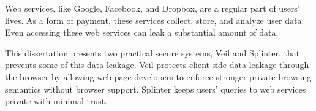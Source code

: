 Web services, like Google, Facebook, and Dropbox, 
are a regular part of users' lives. 
As a form of payment, these services
collect, store, and analyze user data.
Even accessing 
these web services can leak a substantial
amount of data. 

This dissertation presents two practical
secure systems,
Veil and Splinter, that
prevents some of this data
leakage. Veil protects 
client-side data leakage
through the browser by allowing
web page developers to enforce stronger 
private browsing semantics without
browser support. Splinter keeps
users' queries to web
services private with minimal
trust.